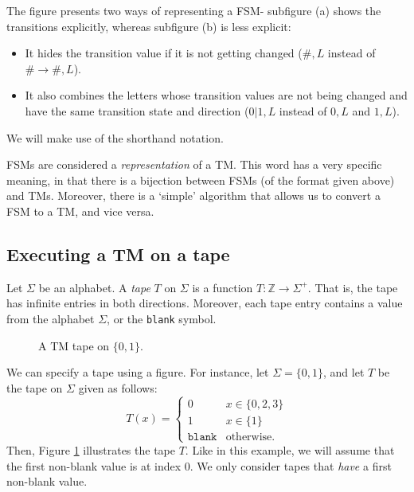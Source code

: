 The figure presents two ways of representing a FSM- subfigure (a) shows the transitions explicitly, whereas subfigure (b) is less explicit:
\begin{itemize}
    \item It hides the transition value if it is not getting changed ($\#, L$ instead of $\# \to \#, L$). 
    \item It also combines the letters whose transition values are not being changed and have the same transition state and direction ($0|1, L$ instead of $0, L$ and $1, L$). 
\end{itemize}
We will make use of the shorthand notation.

FSMs are considered a \emph{representation} of a TM. This word has a very specific meaning, in that there is a bijection between FSMs (of the format given above) and TMs. Moreover, there is a `simple' algorithm that allows us to convert a FSM to a TM, and vice versa.

\subsection{Executing a TM on a tape}
Let $\Sigma$ be an alphabet. A \emph{tape} $T$ on $\Sigma$ is a function $T\colon \mathbb{Z} \to \Sigma^+$. That is, the tape has infinite entries in both directions. Moreover, each tape entry contains a value from the alphabet $\Sigma$, or the \texttt{blank} symbol. 

\begin{figure}[htb]
    \centering
    \caption{A TM tape on $\{0, 1\}$.}
    \label{fig:tape_example}
\end{figure}
We can specify a tape using a figure. For instance, let $\Sigma = \{0, 1\}$, and let $T$ be the tape on $\Sigma$ given as follows:
\[T(x) = \begin{cases}
    0 & x \in \{0, 2, 3\} \\
    1 & x \in \{1\} \\
    \texttt{blank} & \text{otherwise}.
\end{cases}\]
Then, Figure \ref{fig:tape_example} illustrates the tape $T$. Like in this example, we will assume that the first non-blank value is at index 0. We only consider tapes that \textit{have} a first non-blank value.

